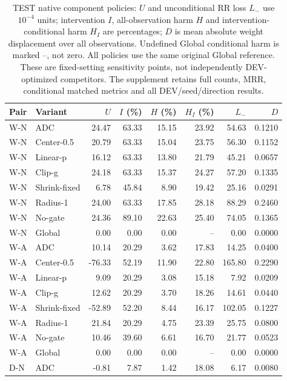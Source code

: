 \begin{table}[htbp]
\centering\footnotesize\setlength{\tabcolsep}{3pt}
\caption{TEST native component policies: $U$ and unconditional RR loss $L_-$ use $10^{-4}$ units; intervention $I$, all-observation harm $H$ and intervention-conditional harm $H_I$ are percentages; $D$ is mean absolute weight displacement over all observations. Undefined Global conditional harm is marked --, not zero. All policies use the same original Global reference. These are fixed-setting sensitivity points, not independently DEV-optimized competitors. The supplement retains full counts, MRR, conditional matched metrics and all DEV/seed/direction results.}
\label{tab:component-risk_primary}
\begin{tabular}{llrrrrrr}
\toprule
Pair & Variant & $U$ & $I$ (\%) & $H$ (\%) & $H_I$ (\%) & $L_-$ & $D$\\
\midrule
W-N & ADC & 24.47 & 63.33 & 15.15 & 23.92 & 54.63 & 0.1210\\
W-N & Center-0.5 & 20.79 & 63.33 & 15.04 & 23.75 & 56.30 & 0.1152\\
W-N & Linear-p & 16.12 & 63.33 & 13.80 & 21.79 & 45.21 & 0.0657\\
W-N & Clip-g & 24.18 & 63.33 & 15.37 & 24.27 & 57.20 & 0.1335\\
W-N & Shrink-fixed & 6.78 & 45.84 & 8.90 & 19.42 & 25.16 & 0.0291\\
W-N & Radius-1 & 24.00 & 63.33 & 17.85 & 28.18 & 88.29 & 0.2460\\
W-N & No-gate & 24.36 & 89.10 & 22.63 & 25.40 & 74.05 & 0.1365\\
W-N & Global & 0.00 & 0.00 & 0.00 & -- & 0.00 & 0.0000\\
W-A & ADC & 10.14 & 20.29 & 3.62 & 17.83 & 14.25 & 0.0400\\
W-A & Center-0.5 & -76.33 & 52.19 & 11.90 & 22.80 & 165.80 & 0.2290\\
W-A & Linear-p & 9.09 & 20.29 & 3.08 & 15.18 & 7.92 & 0.0209\\
W-A & Clip-g & 12.62 & 20.29 & 3.70 & 18.26 & 14.61 & 0.0440\\
W-A & Shrink-fixed & -52.89 & 52.20 & 8.44 & 16.17 & 102.05 & 0.1227\\
W-A & Radius-1 & 21.84 & 20.29 & 4.75 & 23.39 & 25.75 & 0.0800\\
W-A & No-gate & 10.46 & 39.60 & 6.61 & 16.70 & 21.77 & 0.0523\\
W-A & Global & 0.00 & 0.00 & 0.00 & -- & 0.00 & 0.0000\\
D-N & ADC & -0.81 & 7.87 & 1.42 & 18.08 & 6.17 & 0.0080\\

\end{tabular}
\end{table}
